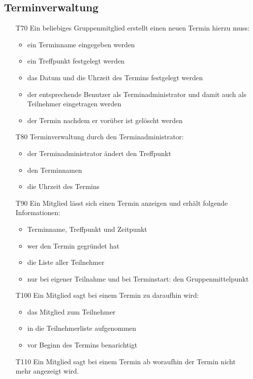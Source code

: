\documentclass{scrartcl}
\begin{document}
	\subsection{Terminverwaltung}
	\begin{itemize}[nosep] 
		\item[T70] Ein beliebiges Gruppenmitglied erstellt einen neuen Termin hierzu muss:
			\begin{itemize}
			\item ein Terminname eingegeben werden
			\item ein Treffpunkt festgelegt werden
			\item das Datum und die Uhrzeit des Termins festgelegt werden
			\item der entsprechende Benutzer als Terminadministrator und damit auch als Teilnehmer eingetragen werden
			\item der Termin nachdem er vorüber ist gelöscht werden
			\end{itemize}
		\item[T80] Terminverwaltung durch den Terminadministrator:
			\begin{itemize}
			\item der Terminadministrator ändert den Treffpunkt
			\item den Terminnamen
			\item die Uhrzeit des Termins
			\end{itemize}
		\item[T90] Ein Mitglied lässt sich einen Termin anzeigen und erhält folgende Informationen:
			\begin{itemize}
			\item Terminname, Treffpunkt und Zeitpunkt
			\item wer den Termin gegründet hat
			\item die Liste aller Teilnehmer
			\item nur bei eigener Teilnahme und bei Terminstart: den Gruppenmittelpunkt
			\end{itemize}
		\item[T100] Ein Mitglied sagt bei einem Termin zu daraufhin wird:
			\begin{itemize}
			\item das Mitglied zum Teilnehmer
			\item in die Teilnehmerliste aufgenommen
			\item vor Beginn des Termins benarichtigt
			\end{itemize}
		\item[T110] Ein Mitglied sagt bei einem Termin ab woraufhin der Termin nicht mehr angezeigt wird. 
	\end{itemize}
\end{document}
